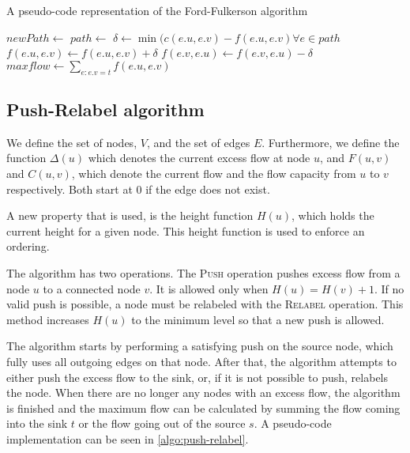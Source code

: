 \begin{algorithm}
\caption{A pseudo-code representation of the Ford-Fulkerson algorithm}
\label{algo:ford-fulkerson}
\begin{algorithmic}

		\State {}
	\Else
			\State $newPath \gets$ 
				\State {}
			\EndIf
		\EndFor
		\State \Return{$\emptyset$}
	\EndIf
\EndFunction
\State
{}
	\State $path \gets$ 
	\State $\delta \gets \min(c(e.u, e.v) - f(e.u, e.v) \forall e \in path$
		\State $f(e.u, e.v) \gets f(e.u, e.v) + \delta$
		\State $f(e.v, e.u) \gets f(e.v, e.u) - \delta$
	\EndFor
\EndWhile
\State $maxflow \gets \sum\limits_{e : e.v = t} f(e.u, e.v)$

\end{algorithmic}
\end{algorithm}

\subsection{Push-Relabel algorithm}
\label{subsect:pushrelabel}

We define the set of nodes, $V$, and the set of edges $E$. Furthermore, we define the function $\Delta(u)$ which denotes the current excess flow at node $u$, and $F(u, v)$ and $C(u, v)$, which denote the current flow and the flow capacity from $u$ to $v$ respectively. Both start at $0$ if the edge does not exist.

A new property that is used, is the height function $H(u)$, which holds the current height for a given node. This height function is used to enforce an ordering.

The algorithm has two operations. The \textsc{Push} operation pushes excess flow from a node $u$ to a connected node $v$. It is allowed only when $H(u) = H(v) + 1$. If no valid push is possible, a node must be relabeled with the \textsc{Relabel} operation. This method increases $H(u)$ to the minimum level so that a new push is allowed.

The algorithm starts by performing a satisfying push on the source node, which fully uses all outgoing edges on that node. After that, the algorithm attempts to either push the excess flow to the sink, or, if it is not possible to push, relabels the node. When there are no longer any nodes with an excess flow, the algorithm is finished and the maximum flow can be calculated by summing the flow coming into the sink $t$ or the flow going out of the source $s$. A pseudo-code implementation can be seen in \autoref{algo:push-relabel}.

